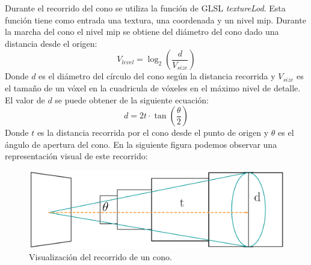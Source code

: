 Durante el recorrido del cono se utiliza la función de GLSL \emph{textureLod}. Esta función tiene como entrada una textura, una coordenada y un nivel mip. Durante la marcha del cono el nivel mip se obtiene del diámetro del cono dado una distancia desde el origen:
\begin{equation}
    V_{level} = \log_2(\frac{d}{V_{size}})
\end{equation}
Donde $d$ es el diámetro del círculo del cono según la distancia recorrida y $V_{size}$ es el tamaño de un vóxel en la cuadricula de vóxeles en el máximo nivel de detalle. El valor de $d$ se puede obtener de la siguiente ecuación:
\begin{equation}
    d = 2t\cdot\tan(\frac{\theta}{2})
\end{equation}
Donde $t$ es la distancia recorrida por el cono desde el punto de origen y $\theta$ es el ángulo de apertura del cono. En la siguiente figura podemos observar una representación visual de este recorrido:
\begin{figure}[H]
    \centering
    \captionsetup{justification=centering}
    \includegraphics[width=.9\linewidth]{media/cone.pdf}
    \caption{Visualización del recorrido de un cono.}
\end{figure}

